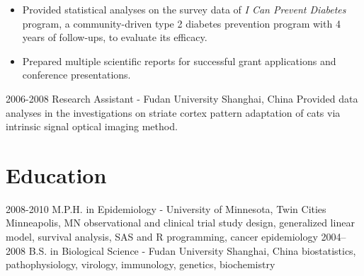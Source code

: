 \begin{entrylist}
{\begin{itemize}
      \item Provided statistical analyses on the survey data of \textit{I Can Prevent Diabetes} program, a community-driven type 2 diabetes prevention program with 4 years of follow-ups, to evaluate its efficacy.
      \item Prepared multiple scientific reports for successful grant applications and conference presentations.
    \end{itemize}
    }
  \entry
    {2006-2008}
    {Research Assistant - Fudan University}
    {Shanghai, China}
    {Provided data analyses in the investigations on striate cortex pattern adaptation of cats via intrinsic signal optical imaging method.}
\end{entrylist}

\section{Education}

\begin{entrylist}
  \entry
    {2008-2010}
    {M.P.H. in Epidemiology - University of Minnesota, Twin Cities}
    {Minneapolis, MN}
    {observational and clinical trial study design, generalized linear model, survival analysis, SAS and R programming, cancer epidemiology}
  \entry
    {2004–2008}
    {B.S. in Biological Science - Fudan University}
    {Shanghai, China}
    {biostatistics, pathophysiology, virology, immunology, genetics, biochemistry}
\end{entrylist}
